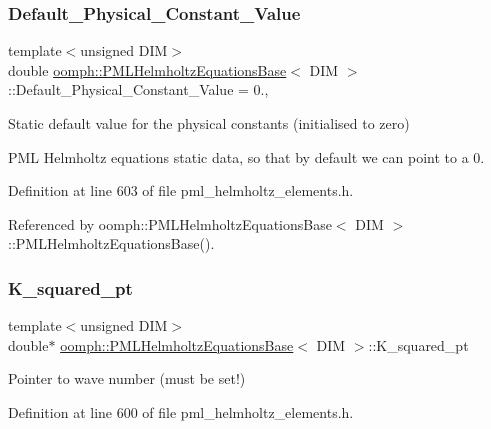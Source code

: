 \subsubsection{\texorpdfstring{Default\+\_\+\+Physical\+\_\+\+Constant\+\_\+\+Value}{Default\_Physical\_Constant\_Value}}
{\footnotesize\ttfamily template$<$unsigned D\+IM$>$ \\
double \hyperlink{classoomph_1_1PMLHelmholtzEquationsBase}{oomph\+::\+P\+M\+L\+Helmholtz\+Equations\+Base}$<$ D\+IM $>$\+::Default\+\_\+\+Physical\+\_\+\+Constant\+\_\+\+Value = 0.\hspace{0.3cm}{\ttfamily [static]}, {\ttfamily [protected]}}



Static default value for the physical constants (initialised to zero) 

P\+ML Helmholtz equations static data, so that by default we can point to a 0. 

Definition at line 603 of file pml\+\_\+helmholtz\+\_\+elements.\+h.



Referenced by oomph\+::\+P\+M\+L\+Helmholtz\+Equations\+Base$<$ D\+I\+M $>$\+::\+P\+M\+L\+Helmholtz\+Equations\+Base().

\mbox{\label{classoomph_1_1PMLHelmholtzEquationsBase_aa214aa3a9117426abdceab9364c558b7}} 
\subsubsection{\texorpdfstring{K\+\_\+squared\+\_\+pt}{K\_squared\_pt}}
{\footnotesize\ttfamily template$<$unsigned D\+IM$>$ \\
double$\ast$ \hyperlink{classoomph_1_1PMLHelmholtzEquationsBase}{oomph\+::\+P\+M\+L\+Helmholtz\+Equations\+Base}$<$ D\+IM $>$\+::K\+\_\+squared\+\_\+pt\hspace{0.3cm}{\ttfamily [protected]}}



Pointer to wave number (must be set!) 



Definition at line 600 of file pml\+\_\+helmholtz\+\_\+elements.\+h.



